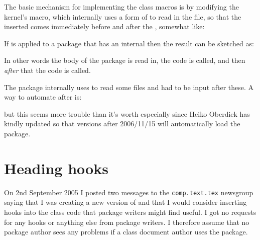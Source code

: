     The basic mechanism for implementing the class macros is by modifying
the kernel's \cmd{\InputIfFileExists} macro, which internally uses a form of
 to read in the file, so that the inserted  comes 
immediately before and after the , somewhat like:
\begin{lcode}
\renewcommand{\InputIfFileExists}[1]{%
  ...
  <before code>  <after code>}
\end{lcode}

    If \cmd{\AtEndPackage} is applied to a package that has an internal
\cmd{\AtEndOfPackage} then the result can be sketched as:
\begin{lcode}
\newcommand{\usepackage}[1]{%
  ...
  <before code>
  
  <after code>
  <AtEndOfPackage code>
}
\end{lcode}
In other words the body of the package is read in, the \cmd{\AtEndPackage} code
is called, and then \emph{after} that the \cmd{\AtEndOfPackage} code is called.

    The  package internally uses \cmd{\AtEndOfPackage} to read
some files and  had to be input after these. A way to automate
 after  is:
\begin{lcode}
\end{lcode}
but this seems more trouble than it's worth especially since 
Heiko Oberdiek has kindly updated  
so that versions after 2006/11/15  will automatically load the 
 package.



\renewcommand{\memsecinfo}[5]{\edef\Margi{#1}\edef\Margii{#2}%
                              \edef\Margiii{#3}\edef\Margiv{#4}%
                              \edef\Margv{#5}}
\section{Heading hooks}

    On 2nd September 2005 I posted two messages to the 
\texttt{comp.text.tex} newsgroup
saying that I was creating a new version of  and
that I would consider inserting hooks into the class code
that package writers
might find useful. I got no requests for any hooks or anything
else from package writers. I therefore assume that no package
author sees any problems if a  class document 
author uses the package.

